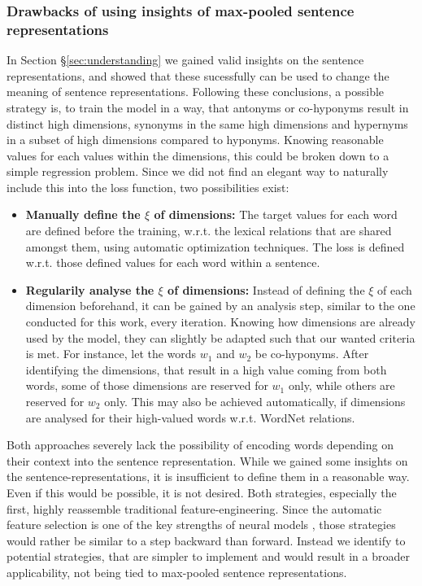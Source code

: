 \subsubsection{Drawbacks of using insights of max-pooled sentence representations}
In Section §\ref{sec:understanding} we gained valid insights on the sentence representations, and showed that these sucessfully can be used to change the meaning of sentence representations. Following these conclusions, a possible strategy is, to train the model in a way, that antonyms or co-hyponyms result in distinct high dimensions, synonyms in the same high dimensions and hypernyms in a subset of high dimensions compared to hyponyms. Knowing reasonable values for each values within the dimensions, this could be broken down to a simple regression problem. Since we did not find an elegant way to naturally include this into the loss function, two possibilities exist:
\begin{itemize}
\item \textbf{Manually define the $\xi$ of dimensions:} The target values for each word are defined before the training, w.r.t. the lexical relations that are shared amongst them, using automatic optimization techniques. The loss is defined w.r.t. those defined values for each word within a sentence.
\item \textbf{Regularily analyse the $\xi$ of dimensions:} Instead of defining the $\xi$ of each dimension beforehand, it can be gained by an analysis step, similar to the one conducted for this work, every iteration. Knowing how dimensions are already used by the model, they can slightly be adapted such that our wanted criteria is met. For instance, let the words $w_1$ and $w_2$ be co-hyponyms. After identifying the dimensions, that result in a high value coming from both words, some of those dimensions are reserved for $w_1$ only, while others are reserved for $w_2$ only. This may also be achieved automatically, if dimensions are analysed for their high-valued words w.r.t. WordNet relations.
\end{itemize}
Both approaches severely lack the possibility of encoding words depending on their context into the sentence representation. While we gained some insights on the sentence-representations, it is insufficient to define them in a reasonable way. Even if this would be possible, it is not desired. Both strategies, especially the first, highly reassemble traditional feature-engineering. Since the automatic feature selection is one of the key strengths of neural models \citep{bengio2013representation}, those strategies would rather be similar to a step backward than forward. Instead we identify to potential strategies, that are simpler to implement and would result in a broader applicability, not being tied to max-pooled sentence representations.

